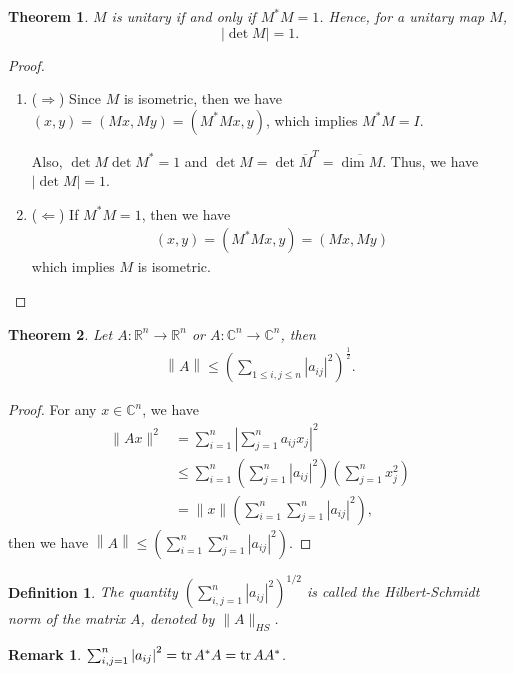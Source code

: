 \documentclass[11pt]{book}
\newtheorem{definition}{Definition}[chapter]
\newtheorem{theorem}{Theorem}[chapter]
\newtheorem{remark}{Remark}[chapter]
\theoremstyle{definition}
\numberwithin{equation}{chapter}
\begin{document}
\begin{theorem}
$M$ is unitary if and only if $M^*M = 1$. Hence, for a unitary map $M$, $$\left|\det M\right| = 1.$$
\end{theorem}
\begin{proof}
~\begin{enumerate}[label=(\arabic*)]
    \item ($\Rightarrow$) Since $M$ is isometric, then we have $(x,y) = (Mx, My) = (M^* M x, y)$, which implies $M^* M = I$.
    
    Also, $\det M \det M^* = 1$ and $\det M = \det \overline{M}^T = \overline{\dim M}$. Thus, we have $|\det M| = 1$.
    \item ($\Leftarrow$) If $M^*M = 1$, then we have
    \begin{align*}
        (x,y) = (M^* M x, y) = (Mx, My)
    \end{align*}
    which implies $M$ is isometric.
\end{enumerate}
\end{proof}

\medskip

\begin{theorem}
Let $A:\mathbb{R}^n \to \mathbb{R}^n$ or $A:\mathbb{C}^n \to \mathbb{C}^n$, then 
\begin{align*}
    \left\|A\right\| \leq \left(\sum_{1\leq i,j\leq n} \left|a_{ij}\right|^2\right)^{\frac{1}{2}}.
\end{align*}
\end{theorem}
\begin{proof}
For any $x\in \mathbb{C}^n$, we have
\begin{align*}
    \|Ax\|^2 & = \sum^n_{i=1} \left|\sum^n_{j=1}a_{ij} x_j\right|^2 \\
    & \leq \sum^n_{i=1} \left(\sum^n_{j=1}\left|a_{ij}\right|^2 \right) \left(\sum^n_{j=1} x_j^2 \right) \\
    & = \|x\| \left(\sum^n_{i=1}\sum^n_{j=1}\left|a_{ij}\right|^2 \right),
\end{align*}
then we have $\left\|A\right\|\leq \left(\sum^n_{i=1}\sum^n_{j=1}\left|a_{ij}\right|^2 \right)$.
\end{proof}

\begin{definition}
The quantity $\left(\sum^n_{i,j=1}\left|a_{ij}\right|^2 \right)^{1/2}$ is called the Hilbert-Schmidt norm of the matrix $A$, denoted by $\|A\|_{HS}$. 
\end{definition}

\begin{remark}
$\sum^n_{i,j=1}\left|a_{ij}\right|^2 = \tr A^*A = \tr AA^*$.
\end{remark}
\end{document}
